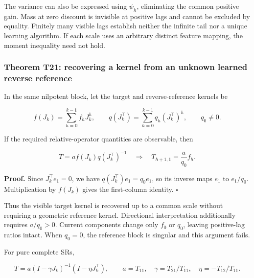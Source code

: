 \documentclass[11pt,a4paper]{article}
\begin{document}
The variance can also be expressed using \(\psi_h\), eliminating the
common positive gain. Mass at zero discount is invisible at positive
lags and cannot be excluded by equality. Finitely many visible lags
establish neither the infinite tail nor a unique learning algorithm. If
each scale uses an arbitrary distinct feature mapping, the moment
inequality need not hold.

\subsubsection{Theorem T21: recovering a kernel from an unknown learned
reverse
reference}\label{theorem-t21-recovering-a-kernel-from-an-unknown-learned-reverse-reference}

\par
\noindent\begin{minipage}{\linewidth}

In the same nilpotent block, let the target and reverse-reference
kernels be

\[
f(J_k)=\sum_{h=0}^{k-1}f_hJ_k^h,\qquad
q(J_k^\top)=\sum_{h=0}^{k-1}q_h(J_k^\top)^h,\qquad q_0\ne0.
\]

\end{minipage}\par

\par
\noindent\begin{minipage}{\linewidth}

If the required relative-operator quantities are observable, then

\[
T=a f(J_k)q(J_k^\top)^{-1}
\quad\Longrightarrow\quad
T_{h+1,1}=\frac{a}{q_0}f_h.
\]

\end{minipage}\par

\textbf{Proof.} Since \(J_k^\top e_1=0\), we have
\(q(J_k^\top)e_1=q_0e_1\), so its inverse maps \(e_1\) to \(e_1/q_0\).
Multiplication by \(f(J_k)\) gives the first-column identity.
\(\square\)

Thus the visible target kernel is recovered up to a common scale without
requiring a geometric reference kernel. Directional interpretation
additionally requires \(a/q_0>0\). Current components change only
\(f_0\) or \(q_0\), leaving positive-lag ratios intact. When \(q_0=0\),
the reference block is singular and this argument fails.

\par
\noindent\begin{minipage}{\linewidth}

For pure complete SRs,

\[
T=a(I-\gamma J_k)^{-1}(I-\eta J_k^\top),
\qquad
a=T_{11},\quad
\gamma=T_{21}/T_{11},\quad
\eta=-T_{12}/T_{11}.
\]

\end{minipage}\par
\end{document}
